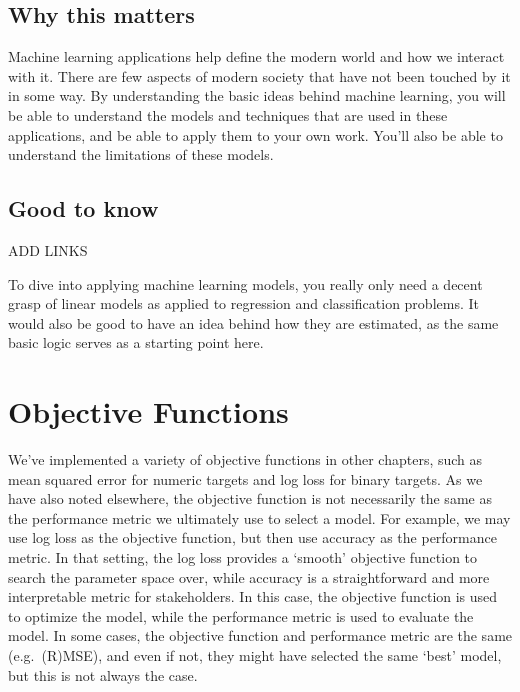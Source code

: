 \documentclass[
  letterpaper,
]{krantz}
\begin{document}
\subsection{Why this matters}\label{why-this-matters}

Machine learning applications help define the modern world and how we
interact with it. There are few aspects of modern society that have not
been touched by it in some way. By understanding the basic ideas behind
machine learning, you will be able to understand the models and
techniques that are used in these applications, and be able to apply
them to your own work. You'll also be able to understand the limitations
of these models.

\subsection{Good to know}\label{good-to-know}

ADD LINKS

To dive into applying machine learning models, you really only need a
decent grasp of linear models as applied to regression and
classification problems. It would also be good to have an idea behind
how they are estimated, as the same basic logic serves as a starting
point here.

\section{Objective Functions}\label{objective-functions}

We've implemented a variety of objective functions in other chapters,
such as mean squared error for numeric targets and log loss for binary
targets. As we have also noted elsewhere, the objective function is not
necessarily the same as the performance metric we ultimately use to
select a model. For example, we may use log loss as the objective
function, but then use accuracy as the performance metric. In that
setting, the log loss provides a `smooth' objective function to search
the parameter space over, while accuracy is a straightforward and more
interpretable metric for stakeholders. In this case, the objective
function is used to optimize the model, while the performance metric is
used to evaluate the model. In some cases, the objective function and
performance metric are the same (e.g.~(R)MSE), and even if not, they
might have selected the same `best' model, but this is not always the
case.
\end{document}
